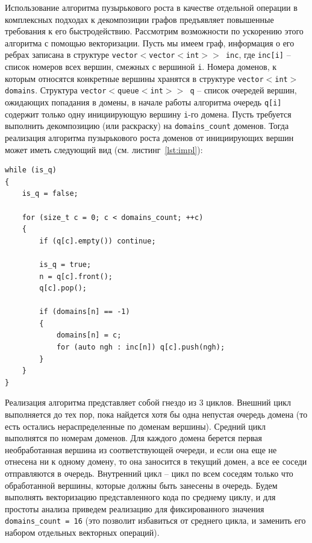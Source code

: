 \documentclass[
11pt,%
tightenlines,%
twoside,%
onecolumn,%
nofloats,%
nobibnotes,%
nofootinbib,%
superscriptaddress,%
noshowpacs,%
centertags]%
{revtex4}
\begin{document}
Использование алгоритма пузырькового роста в качестве отдельной операции в комплексных подходах к декомпозиции графов предъявляет повышенные требования к его быстродействию.
Рассмотрим возможности по ускорению этого алгоритма с помощью векторизации.
Пусть мы имеем граф, информация о его ребрах записана в структуре \texttt{vector$<$vector$<$int$>>$ inc}, где \texttt{inc[i]} -- список номеров всех вершин, смежных с вершиной \texttt{i}.
Номера доменов, к которым относятся конкретные вершины хранятся в структуре \texttt{vector$<$int$>$ domains}.
Структура \texttt{vector$<$queue$<$int$>>$ q} -- список очередей вершин, ожидающих попадания в домены, в начале работы алгоритма очередь \texttt{q[i]} содержит только одну инициирующую вершину \texttt{i}-го домена.
Пусть требуется выполнить декомпозицию (или раскраску) на \texttt{domains\_count} доменов.
Тогда реализация алгоритма пузырькового роста доменов от инициирующих вершин может иметь следующий вид (см. листинг~\ref{lst:impl}):

\begin{lstlisting}[caption={Реализация алгоритма пузырькового роста доменов.},label={lst:impl}]
while (is_q)
{
    is_q = false;

    for (size_t c = 0; c < domains_count; ++c)
    {
        if (q[c].empty()) continue;

        is_q = true;
        n = q[c].front();
        q[c].pop();

        if (domains[n] == -1)
        {
            domains[n] = c;
            for (auto ngh : inc[n]) q[c].push(ngh);
        }
    }
}
\end{lstlisting}

Реализация алгоритма представляет собой гнездо из 3 циклов.
Внешний цикл выполняется до тех пор, пока найдется хотя бы одна непустая очередь домена (то есть остались нераспределенные по доменам вершины).
Средний цикл выполнятся по номерам доменов.
Для каждого домена берется первая необработанная вершина из соответствующей очереди, и если она еще не отнесена ни к одному домену, то она заносится в текущий домен, а все ее соседи отправляются в очередь.
Внутренний цикл -- цикл по всем соседям только что обработанной вершины, которые должны быть занесены в очередь.
Будем выполнять векторизацию представленного кода по среднему циклу, и для простоты анализа приведем реализацию для фиксированного значения \texttt{domains\_count = 16} (это позволит избавиться от среднего цикла, и заменить его набором отдельных векторных операций).
\end{document}
